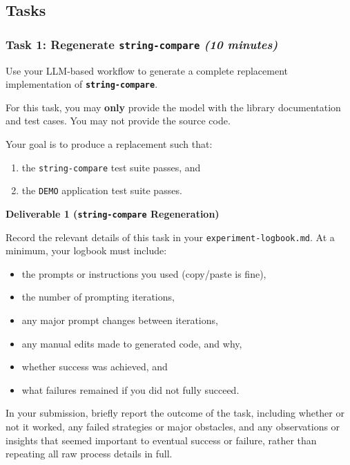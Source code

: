 \subsection{Tasks}

\subsubsection{Task 1: Regenerate \texttt{string-compare} \textnormal{\textit{(10 minutes)}}}

Use your LLM-based workflow to generate a complete replacement implementation of
\textbf{\texttt{string-compare}}.

For this task, you may \textbf{only} provide the model with the library documentation and
test cases. You may not provide the source code.

Your goal is to produce a replacement such that:
\begin{enumerate}
    \item the \texttt{string-compare} test suite passes, and
    \item the \texttt{DEMO} application test suite passes.
\end{enumerate}

\begin{tcolorbox}[colback=yellow!10,colframe=black,boxrule=0.5pt]
\textbf{Deliverable 1 (\texttt{string-compare} Regeneration)}

Record the relevant details of this task in your \texttt{experiment-logbook.md}.
At a minimum, your logbook must include:
\begin{itemize}
    \item the prompts or instructions you used (copy/paste is fine),
    \item the number of prompting iterations,
    \item any major prompt changes between iterations,
    \item any manual edits made to generated code, and why,
    \item whether success was achieved, and
    \item what failures remained if you did not fully succeed.
\end{itemize}
In your submission, briefly report the outcome of the task, including whether or not it worked, any failed strategies or major obstacles, and any observations or insights that seemed important to eventual success or failure, rather than repeating all raw process details in full.
\end{tcolorbox}

